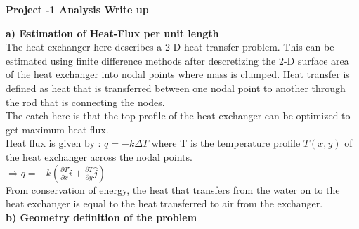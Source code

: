 \documentclass{article}
\begin{document}
\begin{center}
\textbf{\large{Project -1 Analysis Write up}}
\end{center}
\noindent\makebox[\linewidth]{\rule{\paperwidth}{0.4pt}} 
\newline
\textbf{a) Estimation of Heat-Flux per unit length} \\
\newline
The heat exchanger here describes a 2-D heat transfer problem. This can be estimated using finite difference methods after descretizing the 2-D surface area of the heat exchanger into nodal points where mass is clumped. Heat transfer is defined as heat that is transferred between one nodal point to another through the rod that is connecting the nodes. \\
\newline
The catch here is that the top profile of the heat exchanger can be optimized to get maximum heat flux. \\
\newline
Heat flux is given by : $ q = -k \Delta{T}$ where T is the temperature profile $ T(x,y)$ of the heat exchanger across the nodal points. \\
\newline
$ \Rightarrow q = -k (\frac{\partial T}{\partial x} \hat{i} + \frac{\partial T}{\partial y} \hat{j})$ \\
\newline
From conservation of energy, the heat that transfers from the water on to the heat exchanger is equal to the heat transferred to air from the exchanger. \\
\newline
\textbf{b) Geometry definition of the problem} \\
\newline
\end{document}
